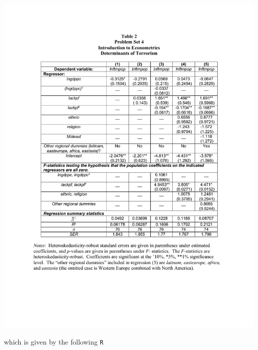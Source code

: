 \documentclass[12pt,letterpaper]{article}
\theoremstyle{definition}
\begin{document}
\begin{center}
  \includegraphics[width=\textwidth]{./figures/table2.pdf}
\end{center}
which is given by the following \verb|R|
\end{document}
